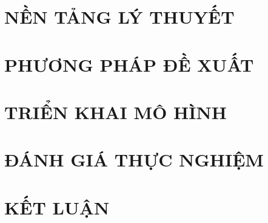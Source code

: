 \documentclass[a4paper,13pt,3p,twoside]{report}
\theoremstyle{definition}
\begin{document}
\newpage
\chapter{NỀN TẢNG LÝ THUYẾT}


\newpage
\chapter{PHƯƠNG PHÁP ĐỀ XUẤT}


\newpage
\chapter{TRIỂN KHAI MÔ HÌNH}


\newpage
\chapter{ĐÁNH GIÁ THỰC NGHIỆM}


\newpage
\chapter{KẾT LUẬN}

\end{document}
